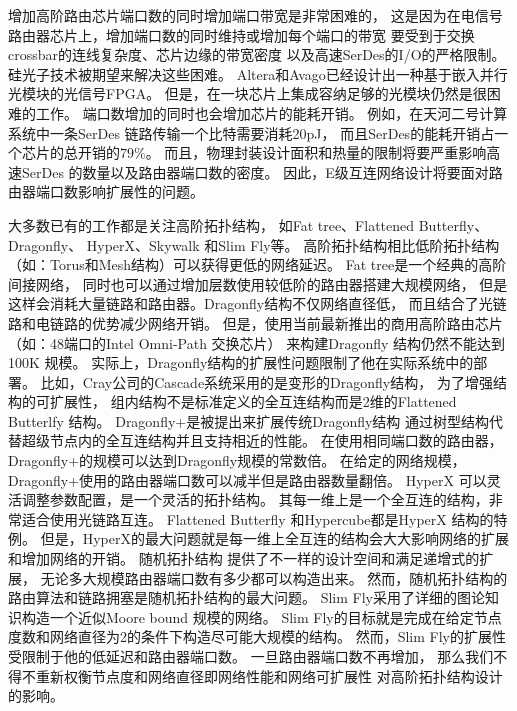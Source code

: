 增加高阶路由芯片端口数的同时增加端口带宽是非常困难的，
这是因为在电信号路由器芯片上，增加端口数的同时维持或增加每个端口的带宽
要受到于交换crossbar的连线复杂度、芯片边缘的带宽密度
以及高速SerDes的I/O的严格限制。
硅光子技术被期望来解决这些困难。
Altera和Avago已经设计出一种基于嵌入并行光模块的光信号FPGA。
但是，在一块芯片上集成容纳足够的光模块仍然是很困难的工作。
端口数增加的同时也会增加芯片的能耗开销。
例如，在天河二号计算系统中一条SerDes 链路传输一个比特需要消耗20pJ，
而且SerDes的能耗开销占一个芯片的总开销的$79\%$。
而且，物理封装设计面积和热量的限制将要严重影响高速SerDes
的数量以及路由器端口数的密度。
因此，E级互连网络设计将要面对路由器端口数影响扩展性的问题。

大多数已有的工作都是关注高阶拓扑结构，
如Fat tree、Flattened Butterfly、Dragonfly、
HyperX、Skywalk 和Slim Fly等。
高阶拓扑结构相比低阶拓扑结构（如：Torus和Mesh结构）可以获得更低的网络延迟。
Fat tree是一个经典的高阶间接网络，
同时也可以通过增加层数使用较低阶的路由器搭建大规模网络，
但是这样会消耗大量链路和路由器。Dragonfly结构不仅网络直径低，
而且结合了光链路和电链路的优势减少网络开销。
但是，使用当前最新推出的商用高阶路由芯片
（如：48端口的Intel Omni-Path 交换芯片）
来构建Dragonfly 结构仍然不能达到100K 规模。
实际上，Dragonfly结构的扩展性问题限制了他在实际系统中的部署。
比如，Cray公司的Cascade系统采用的是变形的Dragonfly结构，
为了增强结构的可扩展性，
组内结构不是标准定义的全互连结构而是2维的Flattened Butterlfy 结构。
Dragonfly+是被提出来扩展传统Dragonfly结构
通过树型结构代替超级节点内的全互连结构并且支持相近的性能。
在使用相同端口数的路由器，Dragonfly+的规模可以达到Dragonfly规模的常数倍。
在给定的网络规模，Dragonfly+使用的路由器端口数可以减半但是路由器数量翻倍。
HyperX 可以灵活调整参数配置，是一个灵活的拓扑结构。
其每一维上是一个全互连的结构，非常适合使用光链路互连。
Flattened Butterfly 和Hypercube都是HyperX 结构的特例。
但是，HyperX的最大问题就是每一维上全互连的结构会大大影响网络的扩展和增加网络的开销。
随机拓扑结构
提供了不一样的设计空间和满足递增式的扩展，
无论多大规模路由器端口数有多少都可以构造出来。
然而，随机拓扑结构的路由算法和链路拥塞是随机拓扑结构的最大问题。
Slim Fly采用了详细的图论知识构造一个近似Moore bound 规模的网络。
Slim Fly的目标就是完成在给定节点度数和网络直径为2的条件下构造尽可能大规模的结构。
然而，Slim Fly的扩展性受限制于他的低延迟和路由器端口数。
一旦路由器端口数不再增加，
那么我们不得不重新权衡节点度和网络直径即网络性能和网络可扩展性
对高阶拓扑结构设计的影响。

